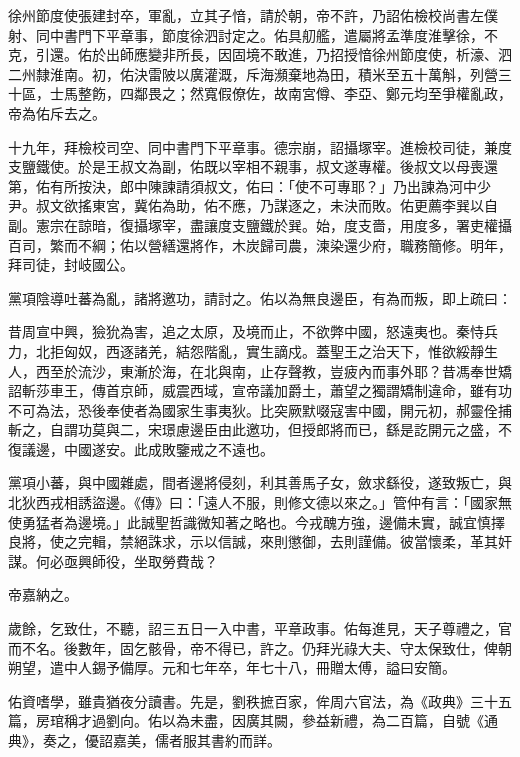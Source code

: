 \begin{pinyinscope}
 徐州節度使張建封卒，軍亂，立其子愔，請於朝，帝不許，乃詔佑檢校尚書左僕射、同中書門下平章事，節度徐泗討定之。佑具舠艦，遣屬將孟準度淮擊徐，不克，引還。佑於出師應變非所長，因固境不敢進，乃招授愔徐州節度使，析濠、泗二州隸淮南。初，佑決雷陂以廣灌溉，斥海瀕棄地為田，積米至五十萬斛，列營三十區，士馬整飭，四鄰畏之；然寬假僚佐，故南宮僔、李亞、鄭元均至爭權亂政，帝為佑斥去之。



 十九年，拜檢校司空、同中書門下平章事。德宗崩，詔攝塚宰。進檢校司徒，兼度支鹽鐵使。於是王叔文為副，佑既以宰相不親事，叔文遂專權。後叔文以母喪還第，佑有所按決，郎中陳諫請須叔文，佑曰：「使不可專耶？」乃出諫為河中少尹。叔文欲搖東宮，冀佑為助，佑不應，乃謀逐之，未決而敗。佑更薦李巽以自副。憲宗在諒暗，復攝塚宰，盡讓度支鹽鐵於巽。始，度支嗇，用度多，署吏權攝百司，繁而不綱；佑以營繕還將作，木炭歸司農，湅染還少府，職務簡修。明年，拜司徒，封岐國公。



 黨項陰導吐蕃為亂，諸將邀功，請討之。佑以為無良邊臣，有為而叛，即上疏曰：



 昔周宣中興，獫狁為害，追之太原，及境而止，不欲弊中國，怒遠夷也。秦恃兵力，北拒匈奴，西逐諸羌，結怨階亂，實生謫戍。蓋聖王之治天下，惟欲綏靜生人，西至於流沙，東漸於海，在北與南，止存聲教，豈疲內而事外耶？昔馮奉世矯詔斬莎車王，傳首京師，威震西域，宣帝議加爵土，蕭望之獨謂矯制違命，雖有功不可為法，恐後奉使者為國家生事夷狄。比突厥默啜寇害中國，開元初，郝靈佺捕斬之，自謂功莫與二，宋璟慮邊臣由此邀功，但授郎將而已，繇是訖開元之盛，不復議邊，中國遂安。此成敗鑒戒之不遠也。



 黨項小蕃，與中國雜處，間者邊將侵刻，利其善馬子女，斂求繇役，遂致叛亡，與北狄西戎相誘盜邊。《傳》曰：「遠人不服，則修文德以來之。」管仲有言：「國家無使勇猛者為邊境。」此誠聖哲識微知著之略也。今戎醜方強，邊備未實，誠宜慎擇良將，使之完輯，禁絕誅求，示以信誠，來則懲御，去則謹備。彼當懷柔，革其奸謀。何必亟興師役，坐取勞費哉？



 帝嘉納之。



 歲餘，乞致仕，不聽，詔三五日一入中書，平章政事。佑每進見，天子尊禮之，官而不名。後數年，固乞骸骨，帝不得已，許之。仍拜光祿大夫、守太保致仕，俾朝朔望，遣中人錫予備厚。元和七年卒，年七十八，冊贈太傅，謚曰安簡。



 佑資嗜學，雖貴猶夜分讀書。先是，劉秩摭百家，侔周六官法，為《政典》三十五篇，房琯稱才過劉向。佑以為未盡，因廣其闕，參益新禮，為二百篇，自號《通典》，奏之，優詔嘉美，儒者服其書約而詳。




\end{pinyinscope}
